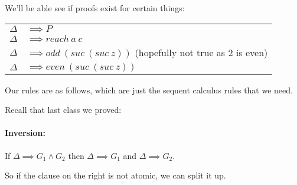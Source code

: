 \documentclass[12 pt]{article}
\begin{document}
       We'll be able see if proofs exist for certain things:
       \\
       \begin{tabular}{l l}
         $\Delta$& $\implies P$
         \\ $\Delta$ & $\implies reach\ a \ c$
         \\ $\Delta$ & $\implies odd\ (suc\ (suc\ z))$ (hopefully not true as $2$ is even)
         \\ $\Delta$ & $\implies even\ (suc\ (suc\ z))$
       \end{tabular}
       Our rules are as follows, which are just the
       sequent calculus rules that we need.
       \begin{center}
         \DP
         \DP
         \DP
         \DP
       \end{center}
       Recall that last class we proved:
       \paragraph{Inversion:} If $\Delta \implies G_1 \land G_2$ then
       $\Delta \implies G_1$ and $\Delta \implies G_2$.

       So if the clause on the right is not atomic, we can split it
       up.
\end{document}
